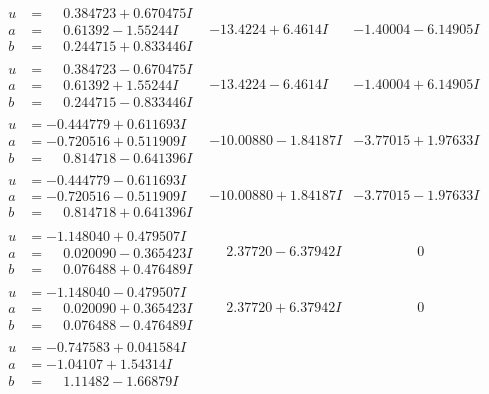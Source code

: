 \documentclass[1p]{elsarticle_modified}
\theoremstyle{definition}
\begin{document}
$$\begin{array}{c|c|c}
\begin{aligned}
u &= \phantom{-}0.384723 + 0.670475 I \\
a &= \phantom{-}0.61392 - 1.55244 I \\
b &= \phantom{-}0.244715 + 0.833446 I\end{aligned}
 & -13.4224 + 6.4614 I & -1.40004 - 6.14905 I \\ \hline\begin{aligned}
u &= \phantom{-}0.384723 - 0.670475 I \\
a &= \phantom{-}0.61392 + 1.55244 I \\
b &= \phantom{-}0.244715 - 0.833446 I\end{aligned}
 & -13.4224 - 6.4614 I & -1.40004 + 6.14905 I \\ \hline\begin{aligned}
u &= -0.444779 + 0.611693 I \\
a &= -0.720516 + 0.511909 I \\
b &= \phantom{-}0.814718 - 0.641396 I\end{aligned}
 & -10.00880 - 1.84187 I & -3.77015 + 1.97633 I \\ \hline\begin{aligned}
u &= -0.444779 - 0.611693 I \\
a &= -0.720516 - 0.511909 I \\
b &= \phantom{-}0.814718 + 0.641396 I\end{aligned}
 & -10.00880 + 1.84187 I & -3.77015 - 1.97633 I \\ \hline\begin{aligned}
u &= -1.148040 + 0.479507 I \\
a &= \phantom{-}0.020090 - 0.365423 I \\
b &= \phantom{-}0.076488 + 0.476489 I\end{aligned}
 & \phantom{-}2.37720 - 6.37942 I & \phantom{-0.000000 } 0 \\ \hline\begin{aligned}
u &= -1.148040 - 0.479507 I \\
a &= \phantom{-}0.020090 + 0.365423 I \\
b &= \phantom{-}0.076488 - 0.476489 I\end{aligned}
 & \phantom{-}2.37720 + 6.37942 I & \phantom{-0.000000 } 0 \\ \hline\begin{aligned}
u &= -0.747583 + 0.041584 I \\
a &= -1.04107 + 1.54314 I \\
b &= \phantom{-}1.11482 - 1.66879 I\end{aligned}

\end{array}$$
\end{document}
